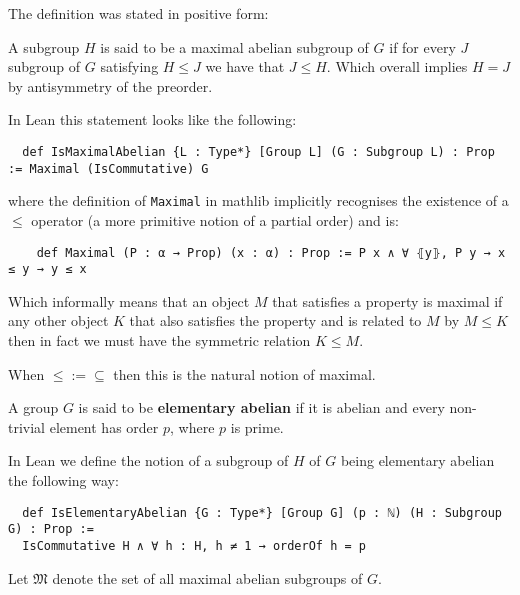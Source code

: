 \begin{remark}
The definition was stated in positive form:

A subgroup $H$ is said to be a maximal abelian subgroup of $G$ if for every $J$ subgroup of $G$ satisfying $H \le J$ we have that $J \le H$. Which overall implies $H = J$ by antisymmetry of the preorder.

In Lean this statement looks like the following:

\begin{verbatim}
  def IsMaximalAbelian {L : Type*} [Group L] (G : Subgroup L) : Prop := Maximal (IsCommutative) G
\end{verbatim}

  where the definition of \texttt{Maximal} in mathlib implicitly recognises the existence of a $\le$ operator (a more primitive notion of a partial order) and is:

  \begin{verbatim}
    def Maximal (P : α → Prop) (x : α) : Prop := P x ∧ ∀ ⦃y⦄, P y → x ≤ y → y ≤ x
  \end{verbatim}

  Which informally means that an object $M$ that satisfies a property is maximal if any other object $K$ that also satisfies the property and is related to $M$ by $M \le K$ then in fact we must have the symmetric relation $K \le M$.

  When $\le := \subseteq$ then this is the natural notion of maximal.
\end{remark}


\begin{definition}
\label{IsElementaryAbelian}
\leanok
A group $G$ is said to be \textbf{elementary abelian} if it is abelian and every non-trivial element has order $p$, where $p$ is prime.
\end{definition}

\begin{remark}
  In Lean we define the notion of a subgroup of $H$ of $G$ being elementary abelian the following way:
  
  \begin{verbatim}
  def IsElementaryAbelian {G : Type*} [Group G] (p : ℕ) (H : Subgroup G) : Prop :=
  IsCommutative H ∧ ∀ h : H, h ≠ 1 → orderOf h = p
  \end{verbatim}
\end{remark}

\begin{definition}
\label{MaximalAbelianSubgroups}
\leanok
Let $\mathfrak{M}$ denote the set of all maximal abelian subgroups of $G$.
\end{definition}

